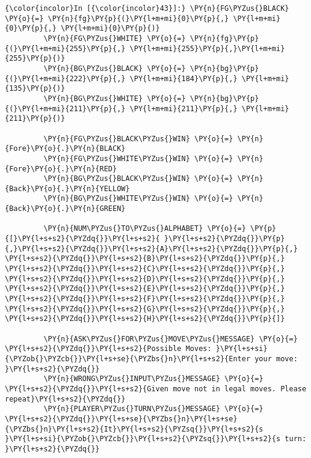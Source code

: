     \begin{Verbatim}[commandchars=\\\{\}]
{\color{incolor}In [{\color{incolor}43}]:} \PY{n}{FG\PYZus{}BLACK} \PY{o}{=} \PY{n}{fg}\PY{p}{(}\PY{l+m+mi}{0}\PY{p}{,} \PY{l+m+mi}{0}\PY{p}{,} \PY{l+m+mi}{0}\PY{p}{)}
         \PY{n}{FG\PYZus{}WHITE} \PY{o}{=} \PY{n}{fg}\PY{p}{(}\PY{l+m+mi}{255}\PY{p}{,} \PY{l+m+mi}{255}\PY{p}{,}\PY{l+m+mi}{255}\PY{p}{)}
         \PY{n}{BG\PYZus{}BLACK} \PY{o}{=} \PY{n}{bg}\PY{p}{(}\PY{l+m+mi}{222}\PY{p}{,} \PY{l+m+mi}{184}\PY{p}{,} \PY{l+m+mi}{135}\PY{p}{)}
         \PY{n}{BG\PYZus{}WHITE} \PY{o}{=} \PY{n}{bg}\PY{p}{(}\PY{l+m+mi}{211}\PY{p}{,} \PY{l+m+mi}{211}\PY{p}{,} \PY{l+m+mi}{211}\PY{p}{)}
         
         \PY{n}{FG\PYZus{}BLACK\PYZus{}WIN} \PY{o}{=} \PY{n}{Fore}\PY{o}{.}\PY{n}{BLACK}
         \PY{n}{FG\PYZus{}WHITE\PYZus{}WIN} \PY{o}{=} \PY{n}{Fore}\PY{o}{.}\PY{n}{RED}
         \PY{n}{BG\PYZus{}BLACK\PYZus{}WIN} \PY{o}{=} \PY{n}{Back}\PY{o}{.}\PY{n}{YELLOW}
         \PY{n}{BG\PYZus{}WHITE\PYZus{}WIN} \PY{o}{=} \PY{n}{Back}\PY{o}{.}\PY{n}{GREEN}
         
         \PY{n}{NUM\PYZus{}TO\PYZus{}ALPHABET} \PY{o}{=} \PY{p}{[}\PY{l+s+s2}{\PYZdq{}}\PY{l+s+s2}{ }\PY{l+s+s2}{\PYZdq{}}\PY{p}{,}\PY{l+s+s2}{\PYZdq{}}\PY{l+s+s2}{A}\PY{l+s+s2}{\PYZdq{}}\PY{p}{,} \PY{l+s+s2}{\PYZdq{}}\PY{l+s+s2}{B}\PY{l+s+s2}{\PYZdq{}}\PY{p}{,} \PY{l+s+s2}{\PYZdq{}}\PY{l+s+s2}{C}\PY{l+s+s2}{\PYZdq{}}\PY{p}{,} \PY{l+s+s2}{\PYZdq{}}\PY{l+s+s2}{D}\PY{l+s+s2}{\PYZdq{}}\PY{p}{,} \PY{l+s+s2}{\PYZdq{}}\PY{l+s+s2}{E}\PY{l+s+s2}{\PYZdq{}}\PY{p}{,} \PY{l+s+s2}{\PYZdq{}}\PY{l+s+s2}{F}\PY{l+s+s2}{\PYZdq{}}\PY{p}{,} \PY{l+s+s2}{\PYZdq{}}\PY{l+s+s2}{G}\PY{l+s+s2}{\PYZdq{}}\PY{p}{,} \PY{l+s+s2}{\PYZdq{}}\PY{l+s+s2}{H}\PY{l+s+s2}{\PYZdq{}}\PY{p}{]}
         
         \PY{n}{ASK\PYZus{}FOR\PYZus{}MOVE\PYZus{}MESSAGE} \PY{o}{=} \PY{l+s+s2}{\PYZdq{}}\PY{l+s+s2}{Possible Moves: }\PY{l+s+si}{\PYZob{}\PYZcb{}}\PY{l+s+se}{\PYZbs{}n}\PY{l+s+s2}{Enter your move: }\PY{l+s+s2}{\PYZdq{}}
         \PY{n}{WRONG\PYZus{}INPUT\PYZus{}MESSAGE} \PY{o}{=} \PY{l+s+s2}{\PYZdq{}}\PY{l+s+s2}{Given move not in legal moves. Please repeat}\PY{l+s+s2}{\PYZdq{}}
         \PY{n}{PLAYER\PYZus{}TURN\PYZus{}MESSAGE} \PY{o}{=} \PY{l+s+s2}{\PYZdq{}}\PY{l+s+se}{\PYZbs{}n}\PY{l+s+se}{\PYZbs{}n}\PY{l+s+s2}{It}\PY{l+s+s2}{\PYZsq{}}\PY{l+s+s2}{s }\PY{l+s+si}{\PYZob{}\PYZcb{}}\PY{l+s+s2}{\PYZsq{}}\PY{l+s+s2}{s turn: }\PY{l+s+s2}{\PYZdq{}}
\end{Verbatim}

